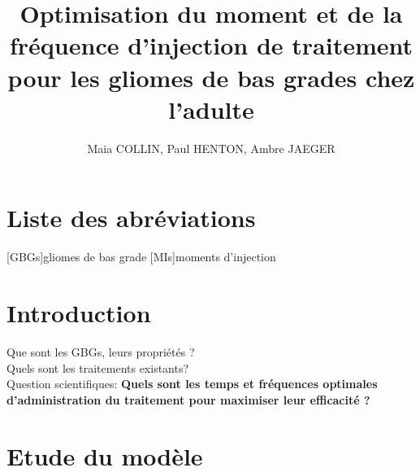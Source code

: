 \documentclass[12pt]{article}
\title{Optimisation du moment et de la fréquence d'injection de traitement pour les gliomes de bas grades chez l'adulte} %
\author{Maia COLLIN, Paul HENTON, Ambre JAEGER} %
\begin{document}
\maketitle %

\section{Liste des abréviations}
\begin{acronym}
[GBGs]{gliomes de bas grade}%
[MIs]{moments d'injection}
\end{acronym}

\section{Introduction}
Que sont les \acp{GBG}, leurs propriétés ?\\
Quels sont les traitements existants?\\
Question scientifiques: \textbf{Quels sont les temps et fréquences optimales d'administration du traitement pour maximiser leur efficacité ?}


\section{Etude du modèle}
\end{document}
